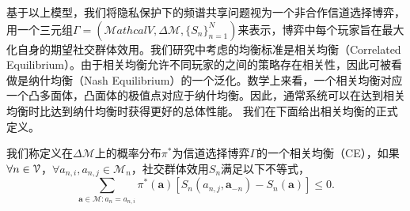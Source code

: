 
基于以上模型，我们将隐私保护下的频谱共享问题视为一个非合作信道选择博弈，用一个三元组$\Gamma=\left(\mathcal{M}athcal{V},\Delta\mathcal{M},\{S_n\}_{n=1}^N\right)$来表示，博弈中每个玩家旨在最大化自身的期望社交群体效用。我们研究中考虑的均衡标准是{\kaishu 相关均衡（Correlated Equilibrium）}。由于相关均衡允许不同玩家的之间的策略存在相关性，因此可被看做是{\kaishu 纳什均衡（Nash Equilibrium）}的一个泛化。数学上来看，一个相关均衡对应一个凸多面体，凸面体的极值点对应于纳什均衡。因此，通常系统可以在达到相关均衡时比达到纳什均衡时获得更好的总体性能。
我们在下面给出相关均衡的正式定义。


\begin{df}[相关均衡]
我们称定义在$\Delta\mathcal{M}$上的概率分布$\pi^*$为信道选择博弈$\Gamma$的一个相关均衡（CE），如果$\forall n\in\mathcal{V}$，$\forall a_{n,i},a_{n,j}\in\mathcal{M}_n$，社交群体效用$S_n$满足以下不等式，
\begin{equation}
\sum_{\textbf{a}\in\mathcal{M}:a_n=a_{n,i}}\pi^*(\textbf{a})\left[S_n(a_{n,j},\textbf{a}_{-n})-S_n(\textbf{a})\right]\leq0.
\end{equation}
\end{df}

